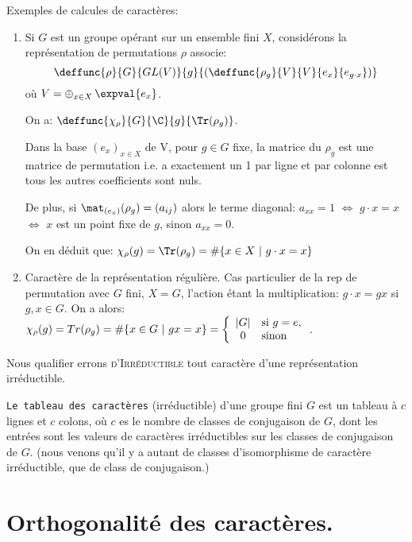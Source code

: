 \begin{exercise}
	Exemples de calcules de caractères:
\begin{enumerate}
	\item Si $G$ est un groupe opérant sur un ensemble fini $X$, considérons la représentation de permutations $\rho$ associe:
	$$\deffunc{\rho}{G}{GL(V)}{g}{\left( \deffunc{\rho_g}{V}{V}{e_x}{e_{g\cdot x}} \right)}$$
	où $V=\mathop{\oplus}_{\substack{x\in X}}\expval{e_x}$.
	
	On a: $\deffunc{\chi_\rho}{G}{\C}{g}{\Tr(\rho_g)}$.

	Dans la base $(e_x)_{x\in X}$ de V, pour $g\in G$ fixe, la matrice du $\rho_g$ est une matrice de permutation i.e. a exactement un 1 par ligne et par colonne est tous les autres coefficients sont nuls.
	
	De plus, si $\mat_{(e_x)}(\rho_g)=(a_{ij})$ alors le terme diagonal: $a_{xx}=1$  $\Leftrightarrow$   $g\cdot x=x$  $\Leftrightarrow$  $x$ est un point fixe de $g$, sinon $a_{xx}=0$.
	
	On en déduit que: $\chi_\rho(g)=\Tr(\rho_g)=\#\{x\in X\ |\ g\cdot x= x\}$
	\item Caractère de la représentation régulière.
	Cas particulier de la rep de permutation avec $G$ fini, $X=G$, l'action étant la multiplication: $g\cdot x=gx$ si $g,x\in G$.
	On a alors: $\chi_\rho(g)=Tr(\rho_g)=\#\{x\in G\ |\ gx=x\}=\left\{\begin{array}{cl}|G|&\mbox{si }g=e\mbox,\\0& \mbox{sinon }\end{array}\right.$.
\end{enumerate}
\end{exercise}


\begin{definition}
	Nous qualifier errons \textsc{d’Irréductible} tout caractère d’une représentation irréductible.
\end{definition}
	
	\texttt{Le tableau des caractères} (irréductible) d'une groupe fini $G$ est un tableau  à $c$ lignes et $c$ colons, où $c$ es le nombre de classes de conjugaison de $G$, dont les entrées sont les valeurs de caractères irréductibles sur les classes de conjugaison de $G$. (nous venons qu'il y a autant de classes d'isomorphisme de caractère irréductible, que de class de conjugaison.) 
	
\section{Orthogonalité des caractères.} %

